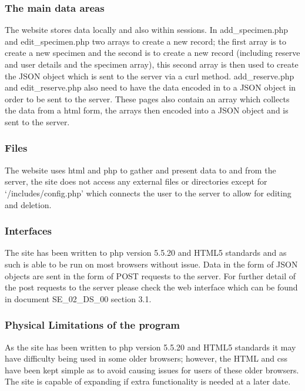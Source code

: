     \subsubsection{The main data areas}
        The website stores data locally and also within sessions. In add\_specimen.php and edit\_specimen.php two arrays to create a new record; the first array is to create a new specimen and the second is to create a new record (including reserve and user details and the specimen array), this second array is then used to create the JSON object which is sent to the server via a curl method. add\_reserve.php and edit\_reserve.php also need to have the data encoded in to a JSON object in order to be sent to the server. These pages also contain an array which collects the data from a html form, the arrays then encoded into a JSON object and is sent to the server. 

    \subsubsection{Files}

        The website uses html and php to gather and present data to and from the server, the site does not access any external files or directories except for `/includes/config.php' which connects the user to the server to allow for editing and deletion.

    \subsubsection{Interfaces}

        The site has been written to php version 5.5.20 and HTML5 standards and as such is able to be run on most browsers without issue. Data in the form of JSON objects are sent in the form of POST requests to the server. For further detail of the post requests to the server please check the web interface which can be found in document SE\_02\_DS\_00 section 3.1.


    \subsubsection{Physical Limitations of the program}

        As the site has been written to php version 5.5.20 and HTML5 standards it may have difficulty being used in some older browsers; however, the HTML and css have been kept simple as to avoid causing issues for users of these older browsers. The site is capable of expanding if extra functionality is needed at a later date.


